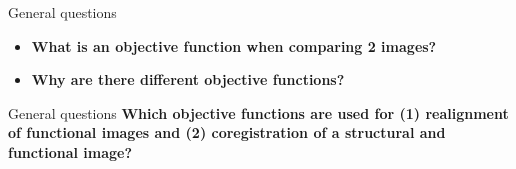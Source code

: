 \documentclass{beamer}
\begin{document}
\begin{frame}{General questions}
  \begin{itemize}
    \item \textbf{What is an objective function when comparing 2 images?}

    \smallskip 

    \bigskip
    \item \textbf{Why are there different objective functions?}

    \smallskip   
  \end{itemize}
\end{frame}


\begin{frame}{General questions}
  \textbf{Which objective functions are used for (1) realignment of functional images and (2) coregistration of a structural and functional image? }

% 
% 
% 
\end{frame}
\end{document}
